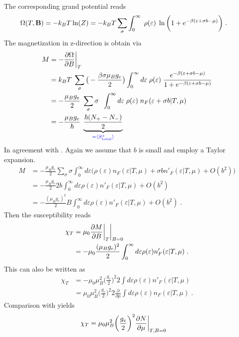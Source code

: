 The corresponding grand  potential reads
%
\begin{align*}
\Omega(T,\mathbf B) &= -k_{B}T \ln(Z) =-k_{B}T   \sum_{\sigma} \int_{0}^{\infty}\;\rho(\varepsilon)\;
\ln\bigg( 1+  e^{-\beta(\varepsilon+\sigma b-\mu)}\bigg)\;.
\end{align*}
%
The magnetization in z-direction is obtain via
%
\begin{align*}
M &= - \frac{\partial \Omega}{\partial B}\bigg|_{T} \\
&=k_{B}T\;\sum_{\sigma}\big( -\frac{\beta\sigma \mu_{B}g_{e}}{2} \big)
\int_{0}^{\infty} d\varepsilon\;\rho(\varepsilon)\;\frac{e^{-\beta(\varepsilon+\sigma b-\mu)}}{1+e^{-\beta(\varepsilon+\sigma b-\mu)}}\\
&=-\frac{\mu_{B}g_{e}}{2} \;\sum_{\sigma}\sigma \;\;
\int_{0}^{\infty} d\varepsilon\;\rho(\varepsilon)\;n_{F}(\varepsilon+\sigma b|T,\mu)\\
&= -\frac{\mu_{B}g_{e}}{\hbar} \;\underbrace{
 \frac{\hbar(N_{+}-N_{-})}{2}
}_{\color{blue} = \langle S_\text{total}^{z} \rangle}
\end{align*}
%
In agreement with . Again we assume that $b$ is small and 
employ a Taylor expansion. 
%
\begin{align*}
M &= -\frac{\mu_{B}g_{e} }{2} \sum_{\sigma} \sigma \int_{0}^{\infty}d\varepsilon \bigg(\rho(\varepsilon) n_{F}(\varepsilon|T,\mu) + \sigma b n'_{F}(\varepsilon|T,\mu)+{O}(b^{2})\bigg)\\
&= -\frac{\mu_{B}g_{e} }{2} 2b \int_{0}^{\infty}d\varepsilon \rho(\varepsilon)  n'_{F}(\varepsilon|T,\mu)+{O}(b^{2})\\
&= -\frac{(\mu_{B}g_{e})^{2} }{2}  B\int_{0}^{\infty}d\varepsilon \rho(\varepsilon)  n'_{F}(\varepsilon|T,\mu)+{O}(b^{2})\;.
\end{align*}
%
Then the susceptibility reads
%
\begin{align}
\chi_{T} &= \mu_{0}\frac{\partial M}{\partial B}\bigg|_{T}\bigg|_{B=0}\notag\\
&=-\mu_{0}\frac{(\mu_{B}g_{e})^{2} }{2}  \int_{0}^{\infty}d\varepsilon \rho(\varepsilon)  n'_{F}(\varepsilon|T,\mu)\notag\;.
\end{align}
%
This can also be written as
%
\begin{align*}
\chi_{T} &= -\mu_{0} \mu_{B}^{2} \bigg(\frac{g_{e}}{2}\bigg)^{2} 2 
\int d\varepsilon \rho(\varepsilon) n'_{F} (\varepsilon|T,\mu)\\
&= \mu_{0} \mu_{B}^{2} \bigg(\frac{g_{e}}{2}\bigg)^{2} 2 
\frac{\partial }{\partial \mu} 
\int d\varepsilon \rho(\varepsilon) n_{F} (\varepsilon|T,\mu)\;.
\end{align*}
%
Comparison with  yields 
\begin{align}\label{eq:Pauli:dN:dmu}
\chi_{T} 
&= \mu_{0} \mu_{B}^{2} \bigg(\frac{g_{e}}{2}\bigg)^{2} 
\frac{\partial N}{\partial \mu}\bigg|_{T,B=0}
\end{align}

